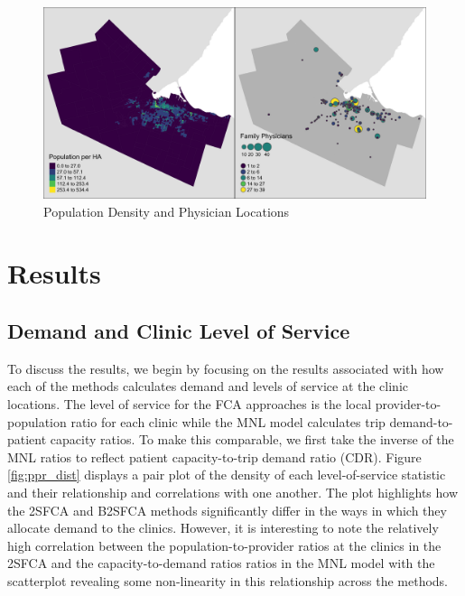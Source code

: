 \documentclass{article}
\begin{document}
\begin{figure}
\includegraphics[width=1\linewidth]{./img/study_area_map} \caption{\label{fig:study_area_map}Population Density and Physician Locations}\label{fig:plot study_area_map}
\end{figure}

\hypertarget{results}{%
\section{Results}\label{results}}

\hypertarget{demand-and-clinic-level-of-service}{%
\subsection{Demand and Clinic Level of
Service}\label{demand-and-clinic-level-of-service}}

To discuss the results, we begin by focusing on the results associated
with how each of the methods calculates demand and levels of service at
the clinic locations. The level of service for the FCA approaches is the
local provider-to-population ratio for each clinic while the MNL model
calculates trip demand-to-patient capacity ratios. To make this
comparable, we first take the inverse of the MNL ratios to reflect
patient capacity-to-trip demand ratio (CDR). Figure \ref{fig:ppr_dist}
displays a pair plot of the density of each level-of-service statistic
and their relationship and correlations with one another. The plot
highlights how the 2SFCA and B2SFCA methods significantly differ in the
ways in which they allocate demand to the clinics. However, it is
interesting to note the relatively high correlation between the
population-to-provider ratios at the clinics in the 2SFCA and the
capacity-to-demand ratios ratios in the MNL model with the scatterplot
revealing some non-linearity in this relationship across the methods.
\end{document}
